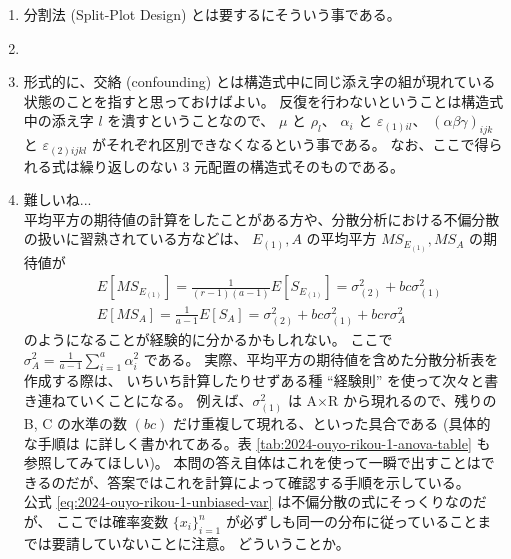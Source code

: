 \documentclass[./main.tex]{subfiles}
\begin{document}
    \begin{enumerate}
        \item 分割法 (Split-Plot Design) とは要するにそういう事である。
        \item 
        \item 形式的に、交絡 (confounding) とは構造式中に同じ添え字の組が現れている状態のことを指すと思っておけばよい。
        反復を行わないということは構造式中の添え字 $l$ を潰すということなので、
        $\mu$ と $\rho_l$、
        $\alpha_i$ と $\varepsilon_{(1)il}$、
        $(\alpha\beta\gamma)_{ijk}$ と $\varepsilon_{(2)ijkl}$ がそれぞれ区別できなくなるという事である。
        なお、ここで得られる式は繰り返しのない 3 元配置の構造式そのものである。

        \item 難しいね...\\

            平均平方の期待値の計算をしたことがある方や、分散分析における不偏分散の扱いに習熟されている方などは、
            $E_{(1)}, A$ の平均平方 $MS_{E_{(1)}}, MS_A$ の期待値が
            \begin{align*}
                &E [ MS_{E_{(1)}}] 
                    = \frac{1}{(r - 1)(a - 1)} E [ S_{E_{(1)}}]
                    = \sigma_{(2)}^2 + bc \sigma_{(1)}^2\\
                &E [ MS_A ]
                    = \frac{1}{a - 1} E [S_A]
                    = \sigma_{(2)}^2 + bc \sigma_{(1)}^2 + bcr \sigma_A^2
            \end{align*}
            のようになることが経験的に分かるかもしれない。
            ここで $\sigma_A^2 = \frac{1}{a - 1} \sum_{i=1}^a \alpha_i^2$ である。
            実際、平均平方の期待値を含めた分散分析表を作成する際は、
            いちいち計算したりせずある種 ``経験則'' を使って次々と書き連ねていくことになる。
            例えば、$\sigma_{(1)}^2$ は A$\times$R から現れるので、残りの B, C の水準の数 $(bc)$ だけ重複して現れる、といった具合である
             (具体的な手順は \cite{nagata:2000} に詳しく書かれてある。表 \ref{tab:2024-ouyo-rikou-1-anova-table} も参照してみてほしい)。
            本問の答え自体はこれを使って一瞬で出すことはできるのだが、答案ではこれを計算によって確認する手順を示している。\\

        公式 \eqref{eq:2024-ouyo-rikou-1-unbiased-var} は不偏分散の式にそっくりなのだが、
        ここでは確率変数 $\{ x_i \}_{i=1}^n$ が必ずしも同一の分布に従っていることまでは要請していないことに注意。
        どういうことか。


\end{enumerate}
\end{document}

